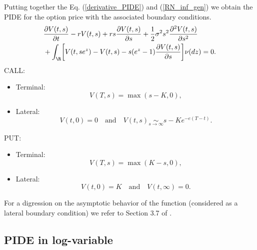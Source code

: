 Putting together the Eq. (\ref{derivative_PIDE}) and (\ref{RN_inf_gen}) we obtain the PIDE for the option price with the associated boundary conditions.
\begin{align}\label{PIDE_option}
&  \frac{\partial V(t,s)}{\partial t} - r V(t,s) + r s \frac{\partial V(t,s)}{\partial s}
+ \frac{1}{2} \sigma^2 s^2 \frac{\partial^2  V(t,s)}{\partial s^2}  \\ \nonumber
&+ \int_{\R} \biggl[ V(t,se^z) - V(t,s) - s(e^z-1)\frac{\partial V(t,s)}{\partial s} \biggr] \nu(dz) = 0.
\end{align}
CALL:
\begin{itemize}
 \item Terminal:
 $$ V(T,s) = \max(s-K,0), $$
 \item Lateral:
 $$ V(t,0) = 0 \quad \mbox{and} \quad V(t, s) \underset{s \to \infty}{\sim} s - Ke^{-e(T-t)}. $$
\end{itemize}
PUT:
\begin{itemize}
 \item Terminal:
 $$ V(T,s) = \max(K-s,0), $$
 \item Lateral:
 $$ V(t,0) = K \quad \mbox{and} \quad V(t, \infty) = 0. $$
\end{itemize}
For a digression on the asymptotic behavior of the function (considered as a lateral boundary condition) we refer to Section 3.7 of \cite{Wilmott}. 

\subsection{PIDE in log-variable}\label{log_var_section}

